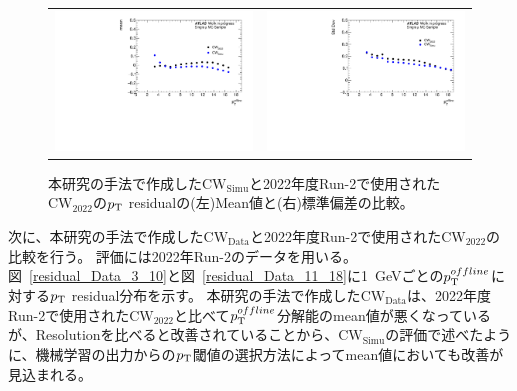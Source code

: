 \begin{figure}
    \begin{tabular}{cc}
    \begin{minipage}[b]{0.45\hsize}
        \hspace*{-1cm}
        \includegraphics[clip, width=8cm]{fig/5/residual_mean_Simu.pdf}
        \subcaption{}
        \label{fig:resi_mean_Simu}
    \end{minipage}&
    \begin{minipage}[b]{0.45\hsize}
        \includegraphics[clip, width=8cm]{fig/5/residual_stdDeVpdf_MC.pdf}
        \subcaption{}
        \label{fig:resi_std_Simu}
    \end{minipage}
    \end{tabular}
    \caption{本研究の手法で作成した$\mathrm{CW_{Simu}}$と2022年度Run-2で使用された$\mathrm{CW_{2022}}$の$p_{\rm{T}}$ residualの(左)Mean値と(右)標準偏差の比較。}
    \label{residual_MC}
\end{figure}

次に、本研究の手法で作成した$\mathrm{CW_{Data}}$と2022年度Run-2で使用された$\mathrm{CW_{2022}}$の比較を行う。
評価には2022年Run-2のデータを用いる。
図~\ref{residual_Data_3_10}と図~\ref{residual_Data_11_18}に1~GeVごとの$p_{\rm{T}}^{offline}$に対する$p_{\rm{T}}$ residual分布を示す。
本研究の手法で作成した$\mathrm{CW_{Data}}$は、2022年度Run-2で使用された$\mathrm{CW_{2022}}$と比べて$p_{\rm{T}}^{offline}$分解能のmean値が悪くなっているが、Resolutionを比べると改善されていることから、$\mathrm{CW_{Simu}}$の評価で述べたように、機械学習の出力からの$p_{\rm{T}}$閾値の選択方法によってmean値においても改善が見込まれる。


